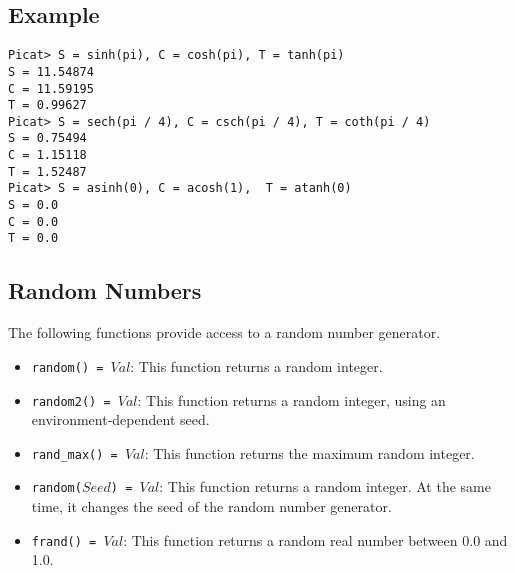 {\subsection*{Example}
\begin{verbatim}
Picat> S = sinh(pi), C = cosh(pi), T = tanh(pi)
S = 11.54874
C = 11.59195
T = 0.99627
Picat> S = sech(pi / 4), C = csch(pi / 4), T = coth(pi / 4)
S = 0.75494
C = 1.15118
T = 1.52487
Picat> S = asinh(0), C = acosh(1),  T = atanh(0)
S = 0.0
C = 0.0
T = 0.0
\end{verbatim}
}
\subsection{Random Numbers}
The following functions provide access to a random number generator.
\begin{itemize}
\item \texttt{random() = $Val$}: This function returns a random integer.
\item \texttt{random2() = $Val$}: This function returns a random integer, using an environment-dependent seed.
\item \texttt{rand\_max() = $Val$}: This function returns the maximum random integer.
\item \texttt{random($Seed$) = $Val$}: This function returns a random integer.  At the same time, it changes the seed of the random number generator.
\item \texttt{frand() = $Val$}: This function returns a random real number between 0.0 and 1.0.

\end{itemize}

